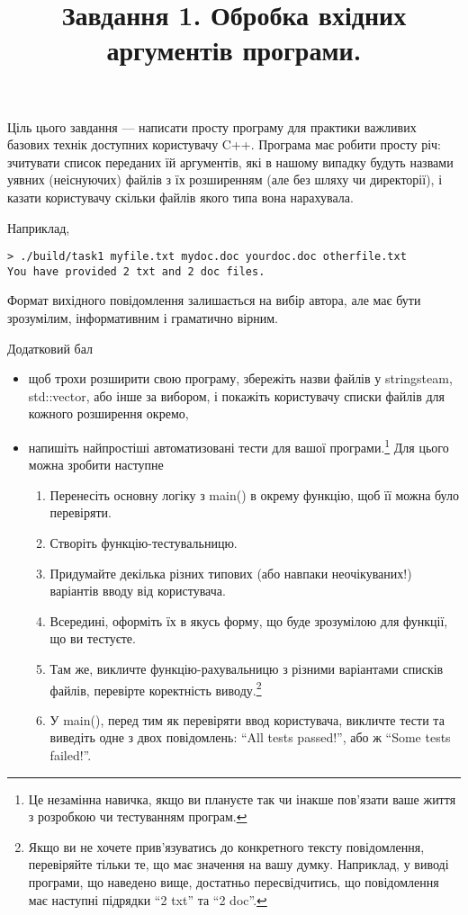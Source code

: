 \documentclass[12pt]{article}
\title{Завдання 1. Обробка вхідних аргументів програми.}
\date{}
\author{}
\begin{document}
\maketitle

Ціль цього завдання — написати просту програму для практики важливих базових технік доступних користувачу C++. Програма має робити просту річ: зчитувати список переданих їй аргументів, які в нашому випадку будуть назвами уявних (неіснуючих) файлів з їх розширенням (але без шляху чи директорії), і казати користувачу скільки файлів якого типа вона нарахувала. 

Наприклад,

\begin{lstlisting}
> ./build/task1 myfile.txt mydoc.doc yourdoc.doc otherfile.txt
You have provided 2 txt and 2 doc files.
\end{lstlisting}

Формат вихідного повідомлення залишається на вибір автора, але має бути зрозумілим, інформативним і граматично вірним.

\begin{center}
    \large{Додатковий бал}
\end{center}

\begin{itemize}
\item щоб трохи розширити свою програму, збережіть назви файлів у stringsteam, std::vector, або інше за вибором, і покажіть користувачу списки файлів для кожного розширення окремо,
\item напишіть найпростіші автоматизовані тести для вашої програми.\footnote{Це незамінна навичка, якщо ви плануєте так чи інакше пов'язати ваше життя з розробкою чи тестуванням програм.}
Для цього можна зробити наступне
\begin{enumerate}
    \item Перенесіть основну логіку з main() в окрему функцію, щоб її можна було перевіряти.
    \item Створіть функцію-тестувальницю.
    \item Придумайте декілька різних типових (або навпаки неочікуваних!) варіантів вводу від користувача.
    \item Всередині, оформіть їх в якусь форму, що буде зрозумілою для функції, що ви тестуєте.
    \item Там же, викличте функцію-рахувальницю з різними варіантами списків файлів, перевірте коректність виводу.\footnote{Якщо ви не хочете прив'язуватись до конкретного тексту повідомлення, перевіряйте тільки те, що має значення на вашу думку. Наприклад, у виводі програми, що наведено вище, достатньо пересвідчитись, що повідомлення має наступні підрядки ``2 txt'' та ``2 doc''.}
    \item У main(), перед тим як перевіряти ввод користувача, викличте тести та виведіть одне з двох повідомлень: ``All tests passed!'', або ж  ``Some tests failed!''.
\end{enumerate}
\end{itemize}
\end{document}
